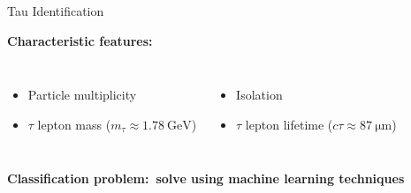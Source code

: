 \documentclass[11pt, xcolor={dvipsnames}, aspectratio=169, notes]{beamer}
\begin{document}
\begin{frame}{Tau Identification}
  \vspace*{0.5em}

  \textbf{Characteristic features:}%

  \begin{columns}[onlytextwidth]

    \begin{itemize}
    \item Particle multiplicity
    \item $\tau$ lepton mass ($m_\tau \approx \SI{1.78}{\GeV}$)
    \end{itemize}


    \begin{itemize}
    \item Isolation
    \item $\tau$ lepton lifetime ($c\tau \approx \SI{87}{\micro\meter}$)
    \end{itemize}
  \end{columns}

  \vspace*{1.25em}
  \pause

  \textbf{\ra Classification problem:\ solve using machine learning techniques}



\end{frame}

\end{document}
